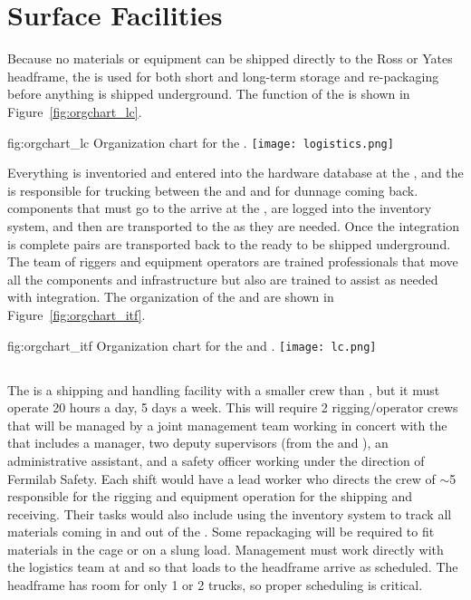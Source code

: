 \section{Surface Facilities}

Because no materials or equipment can be  shipped directly to the Ross or
Yates headframe, the  is used for both short and
long-term storage and re-packaging before anything is shipped underground.
The function of the  is shown in
Figure~\ref{fig:orgchart_lc}.
\begin{dunefigure}{fig:orgchart_lc}
  {Organization chart for the .}
  \texttt{[image: logistics.png]}
\end{dunefigure}
Everything is inventoried and entered into the hardware database at
the , and the  is responsible for trucking between
the  and \surf and for dunnage coming back.  
 components that must go to
the  arrive at the , are logged into the
inventory system, and then are transported to the  as they
are needed. Once the integration is complete  pairs are
transported back to the  ready to be shipped underground.
The team of riggers and equipment operators are trained professionals
that move all the  components and infrastructure but also
are trained to assist as needed with integration. The organization of
the  and  are shown in
Figure~\ref{fig:orgchart_itf}.
\begin{dunefigure}{fig:orgchart_itf}
  {Organization chart for the  and .}
  \texttt{[image: lc.png]}
\end{dunefigure}

\subsection{}

The  is a shipping and handling facility with a smaller crew
than , but it must operate 20 hours a day, 5 days a week.
This will require 2 rigging/operator crews that will be managed by a
joint management team working in concert with the  that
includes a manager, two deputy supervisors (from the  and
), an administrative assistant, and a safety officer
working under the direction of Fermilab Safety.  Each shift would have
a lead worker who directs the crew of $\sim$5  responsible for the
rigging and equipment operation for the shipping and receiving.  Their
tasks would also include using the inventory system to track all
materials coming in and out of the . Some repackaging will
be required to fit materials in the cage or on a slung load.
Management must work directly with the  logistics team at
\surf and  so that loads to the headframe arrive as
scheduled.  The headframe has room for only 1 or 2 trucks, so proper
scheduling is critical.

